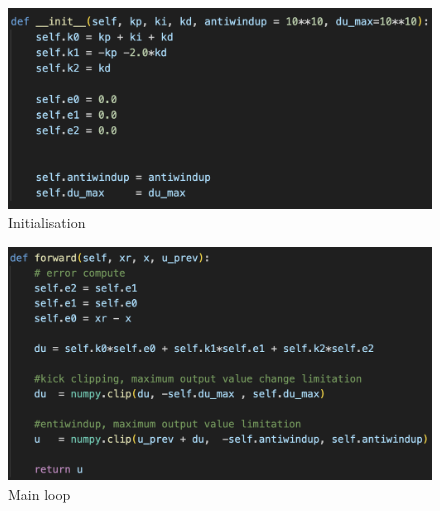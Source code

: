 \documentclass[12pt,twoside,onecolumn,openany,extrafontsizes,dvipsnames]{memoir}
\begin{document}
                \begin{figure}[!htb]
                    \centering
                    \includegraphics[scale=0.8]{../images/control/pid_init.png}
                    \caption{Initialisation}
                    \label{fig:code_discrete_pid}
                \end{figure}

                \begin{figure}[!htb]
                    \centering
                    \includegraphics[scale=0.8]{../images/control/pid_main.png}
                    \caption{Main loop}
                    \label{fig:code_discrete_pid}
                \end{figure}


  
\end{document}
